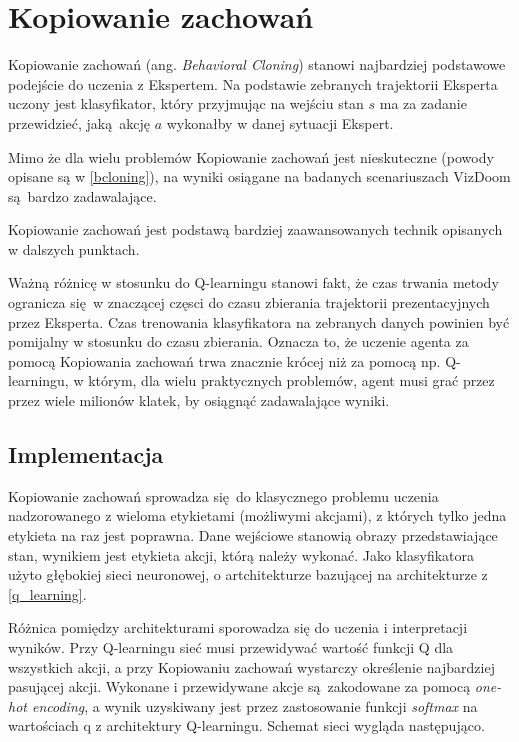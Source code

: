 \section{Kopiowanie zachowań} \label{behavioral_cloning}

Kopiowanie zachowań (ang. \textit{Behavioral Cloning}) stanowi najbardziej podstawowe podejście do uczenia z Ekspertem. Na podstawie zebranych trajektorii Eksperta uczony jest klasyfikator, który przyjmując na wejściu stan $s$ ma za zadanie przewidzieć, jaką akcję $a$ wykonałby w danej sytuacji Ekspert.

Mimo że dla wielu problemów Kopiowanie zachowań jest nieskuteczne (powody opisane są w \ref{bcloning}), na wyniki osiągane na badanych scenariuszach VizDoom są bardzo zadawalające.

Kopiowanie zachowań jest podstawą bardziej zaawansowanych technik opisanych w dalszych punktach.

Ważną różnicę w stosunku do Q-learningu stanowi fakt, że czas trwania metody ogranicza się w znaczącej częsci do czasu zbierania trajektorii prezentacyjnych przez Eksperta. Czas trenowania klasyfikatora na zebranych danych powinien być pomijalny w stosunku do czasu zbierania. Oznacza to, że uczenie agenta za pomocą Kopiowania zachowań trwa znacznie krócej niż za pomocą np. Q-learningu, w którym, dla wielu praktycznych problemów, agent musi grać przez przez wiele milionów klatek, by osiągnąć zadawalające wyniki. 

\subsection{Implementacja}

Kopiowanie zachowań sprowadza się do klasycznego problemu uczenia nadzorowanego z wieloma etykietami (możliwymi akcjami), z których tylko jedna etykieta na raz jest poprawna. Dane wejściowe stanowią obrazy przedstawiające stan, wynikiem jest etykieta akcji, którą należy wykonać. Jako klasyfikatora użyto głębokiej sieci neuronowej, o artchitekturze bazującej na architekturze z \ref{q_learning}.

Różnica pomiędzy architekturami sporowadza się do uczenia i interpretacji wyników. Przy Q-learningu sieć musi przewidywać wartość funkcji Q dla wszystkich akcji, a przy Kopiowaniu zachowań wystarczy określenie najbardziej pasującej akcji. Wykonane i przewidywane akcje są zakodowane za pomocą \textit{one-hot encoding}, a wynik uzyskiwany jest przez zastosowanie funkcji \textit{softmax} na wartościach q z architektury Q-learningu. Schemat sieci wygląda następująco.

